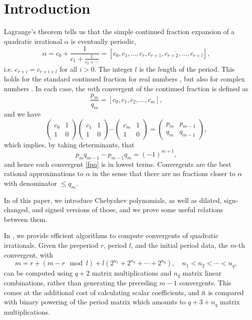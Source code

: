 \documentclass[a4paper,fleqn]{cas-sc}
\begin{document}
\section{Introduction}
Lagrange's theorem tells us that the simple continued fraction expansion of a quadratic irrational $\alpha$ is eventually periodic,
\begin{equation} \label{eq:e1}
\alpha=c_0+\frac{1}{c_1+\frac{1}{c_2+\cdots}}=[c_0,c_1,\ldots,c_r,\overline{c_{r+1},c_{r+2},\ldots,c_{r+l}}],
\end{equation}
i.e. $c_{r+i}=c_{r+i+l}$ for all $i>0$. The integer $l$ is the $l$ength of the period. This holds for the standard continued fraction for real numbers \cite[Theorem 4.3]{Olds}, but also for complex numbers \cite[Corollary 4.6]{DN}. In each case, the $m$th convergent of the continued fraction is
defined as
\begin{equation} \label{fpq}
\frac{p_m}{q_m}=[c_0,c_1,c_2,\ldots,c_m],
\end{equation}
and we have
\begin{equation} \label{eq:e2}
\begin{pmatrix}
c_0 & 1\\
1 & 0
\end{pmatrix}
\begin{pmatrix}
c_1 & 1\\
1 & 0
\end{pmatrix}
\cdots
\begin{pmatrix}
c_m & 1\\
1 & 0
\end{pmatrix}=
\begin{pmatrix}
p_m & p_{m-1}\\
q_m & q_{m-1}
\end{pmatrix},
\end{equation}
which implies, by taking determinants, that
\begin{equation} \label{eq:e3}
p_mq_{m-1}-p_{m-1}q_m=(-1)^{m+1},
\end{equation}
and hence each convergent \eqref{fpq} is in lowest terms. Convergents are the best rational approximations to $\alpha$ in the sense that there are no fractions closer to $\alpha$ with denominator $\leq q_m$.

In  of this paper, we introduce Chebyshev polynomials, as well as dilated, sign-changed, and signed versions of those, and we prove some useful relations between them. 

In , we provide efficient algorithms to compute convergents of quadratic irrationals. Given the preperiod $r$, period $l$, and the initial period data, the $m$-th convergent, with
\[
m=r+\left(m-r \mod l\right)+l\left(2^{n_1}+2^{n_2}+\cdots+2^{n_q}\right),\quad n_1<n_2<\cdots<n_q,
\]
can be computed using $q+2$ matrix multiplications and $n_q$ matrix linear combinations, rather than generating the preceding $m-1$ convergents. This comes at the additional cost of calculating scalar coefficients, and it is compared with binary powering of the period matrix which amounts to $q+3+n_q$ matrix multiplications.
\end{document}
